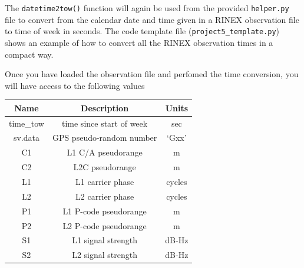 \documentclass[12pt]{article}
\begin{document}
The \lstinline{datetime2tow()} function will again be used from the provided 
\lstinline{helper.py} file to convert from the calendar date and time given in 
a RINEX observation file to time of week in seconds.  The code template file 
(\lstinline{project5_template.py}) shows an example of how to convert all the 
RINEX observation times in a compact way.


Once you have loaded the observation file and perfomed the time conversion, 
you will have access to the following values

\begin{center}
   \begin{tabular}{c|c|c} %
      Name & Description & Units \\
      \hline
         time\_tow & time since start of week  & sec \\
         sv.data & GPS pseudo-random number      & `Gxx' \\
         C1  & L1 C/A pseudorange        & m \\
         C2  & L2C pseudorange        & m \\
         L1  & L1 carrier phase          & cycles \\
         L2  & L2 carrier phase          & cycles \\
         P1  & L1 P-code pseudorange     & m \\
         P2  & L2 P-code pseudorange     & m \\
         S1  & L1 signal strength        & dB-Hz \\
        S2  & L2 signal strength        & dB-Hz
   \end{tabular}
\end{center} %
\end{document}
